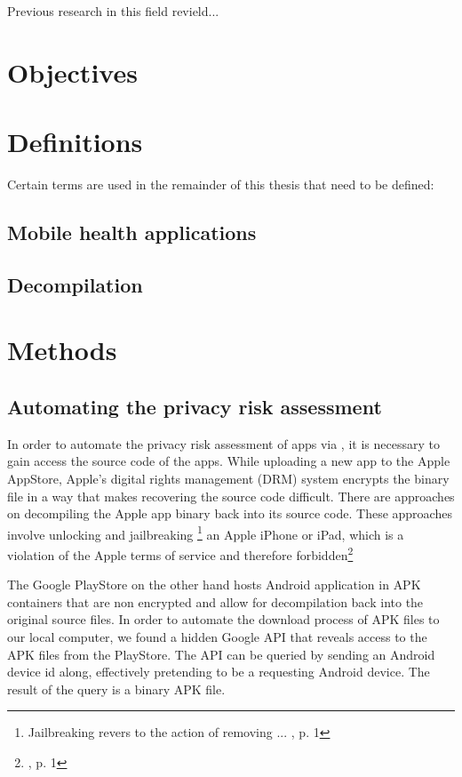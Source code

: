 \documentclass[
	a4paper,
	oneside,
	12pt,
	liststotocnumbered
]{article}
\let\cite\textcite
\begin{document}
Previous research in this field revield...

\section{Objectives}


\section{Definitions}
Certain terms are used in the remainder of this thesis that need to be defined:

\subsection{Mobile health applications}

\subsection{\Sca}

\subsection{Decompilation}


\section{Methods}

\subsection{Automating the privacy risk assessment}

In order to automate the privacy risk assessment of \mH apps via \sca, it is necessary to gain access the source code of the apps. 
While uploading a new app to the Apple AppStore, Apple's digital rights management (\acs{DRM}) system encrypts the binary file in a way that makes recovering the source code difficult. 
There are approaches on decompiling the Apple app binary back into its source code.
These approaches involve unlocking and jailbreaking
\footnote{Jailbreaking revers to the action of removing ... \cite{Kweller2010}, p. 1}
an Apple iPhone or iPad, which is a violation of the Apple terms of service and therefore forbidden\footnote{\cite{Kweller2010}, p. 1}

The Google PlayStore on the other hand hosts Android application in \acs{APK} containers that are non encrypted and allow for decompilation back into the original source files. 
In order to automate the download process of \acs{APK} files to our local computer, we found a hidden Google \acs{API} that reveals access to the \acs{APK} files from the PlayStore. 
The \acs{API} can be queried by sending an Android device id along, effectively pretending to be a requesting Android device.
The result of the query is a binary \acs{APK} file.
\end{document}
